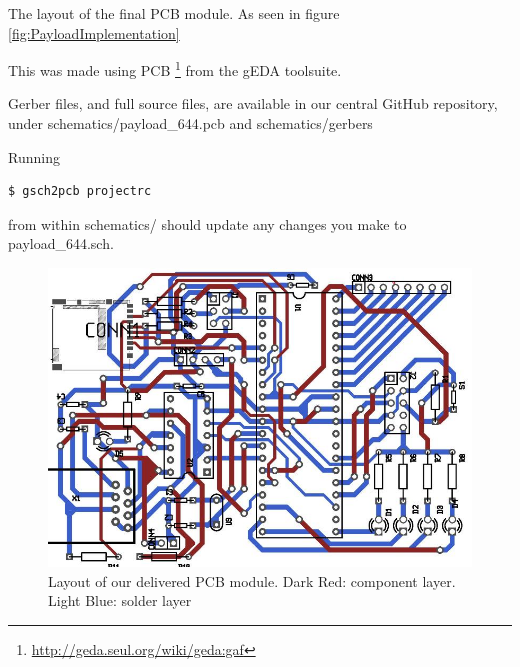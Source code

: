 
\label{appendix-layout}

The layout of the final PCB module. As seen in figure \ref{fig:PayloadImplementation} 

This was made using PCB \footnote{\url{http://geda.seul.org/wiki/geda:gaf}} from the gEDA toolsuite.

Gerber files, and full source files, are available in our central GitHub 
\cite{github} repository, under schematics/payload\_644.pcb and schematics/gerbers

Running
\begin{verbatim} 
$ gsch2pcb projectrc
\end{verbatim}
from within schematics/ should update any changes you make to payload\_644.sch.

\begin{figure}[H]
\includegraphics[width=1.4\textwidth, angle=90]{schematics/payload_644_layout.jpg}
\caption{Layout of our delivered PCB module. Dark Red: component layer. Light Blue: solder layer}
\end{figure}
